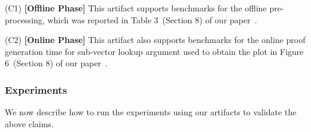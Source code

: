 \documentclass[sigconf]{acmart}
\begin{document}
	
	\begin{compactitem}
		
%		
		\item[(C1)] \textbf{[Offline Phase]} This artifact supports benchmarks for the offline pre-processing, which was reported in Table 3~(Section 8) of our paper~\cite{full-ver}.
		
		\item[(C2)] \textbf{[Online Phase]} This artifact also supports benchmarks for the online proof generation time for sub-vector lookup argument
		used to obtain the plot in Figure 6~(Section 8) of our paper~\cite{full-ver}.
	\end{compactitem}
	
	
	\subsubsection{Experiments} We now describe how to run the experiments using our artifacts to validate the above claims.  
	
	
\end{document}
